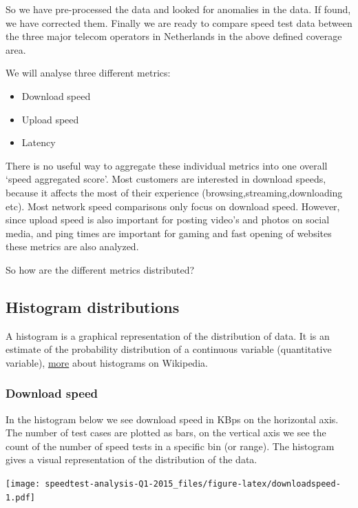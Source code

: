\documentclass[]{article}
\begin{document}
So we have pre-processed the data and looked for anomalies in the data.
If found, we have corrected them. Finally we are ready to compare speed
test data between the three major telecom operators in Netherlands in
the above defined coverage area.

We will analyse three different metrics:

\begin{itemize}
\itemsep1pt\parskip0pt
\item
  Download speed
\item
  Upload speed
\item
  Latency
\end{itemize}

There is no useful way to aggregate these individual metrics into one
overall `speed aggregated score'. Most customers are interested in
download speeds, because it affects the most of their experience
(browsing,streaming,downloading etc). Most network speed comparisons
only focus on download speed. However, since upload speed is also
important for posting video's and photos on social media, and ping times
are important for gaming and fast opening of websites these metrics are
also analyzed.

So how are the different metrics distributed?

\subsection{Histogram distributions}\label{histogram-distributions}

A histogram is a graphical representation of the distribution of data.
It is an estimate of the probability distribution of a continuous
variable (quantitative variable),
\href{https://en.wikipedia.org/wiki/Histogram}{more} about histograms on
Wikipedia.

\subsubsection{Download speed}\label{download-speed}

In the histogram below we see download speed in KBps on the horizontal
axis. The number of test cases are plotted as bars, on the vertical axis
we see the count of the number of speed tests in a specific bin (or
range). The histogram gives a visual representation of the distribution
of the data.

\texttt{[image: speedtest-analysis-Q1-2015\_files/figure-latex/downloadspeed-1.pdf]}
\end{document}
